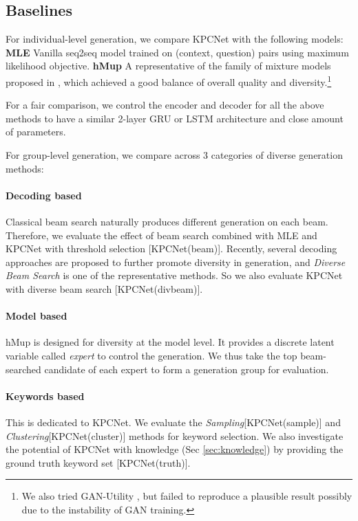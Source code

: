 \subsection{Baselines}

For individual-level generation, we compare KPCNet with the following models: \textbf{MLE} Vanilla seq2seq model trained on (context, question) pairs using maximum likelihood objective.  \textbf{hMup} A representative of the family of mixture models proposed in \citet{shen2019mixture}, which achieved a good balance of overall quality and diversity.\footnote{We also tried GAN-Utility \citep{rao2019answer}, but failed to reproduce a plausible result possibly due to the instability of GAN training.}

For a fair comparison, we control the encoder and decoder for all the above methods to have a similar 2-layer GRU \citep{cho2014learning} or LSTM \citep{hochreiter1997long} architecture and close amount of parameters. 

For group-level generation, we compare across 3 categories of diverse generation methods:

\paragraph{Decoding based} Classical beam search naturally produces different generation on each beam. Therefore, we evaluate the effect of beam search combined with MLE and KPCNet with threshold selection [KPCNet(beam)]. Recently, several decoding approaches \citep{ippolito2019comparison} are proposed to further promote diversity in generation, and \textit{Diverse Beam Search}\citep{vijayakumar2018diverse} is one of the representative methods. So we also evaluate KPCNet with diverse beam search [KPCNet(divbeam)].

\paragraph{Model based} hMup is designed for diversity at the model level. It provides a discrete latent variable called \textit{expert} to control the generation. We thus take the top beam-searched candidate of each expert to form a generation group for evaluation.

\paragraph{Keywords based} This is dedicated to KPCNet. We evaluate the \textit{Sampling}[KPCNet(sample)] and \textit{Clustering}[KPCNet(cluster)] methods for keyword selection. We also investigate the potential of KPCNet with knowledge (Sec \ref{sec:knowledge}) by providing the ground truth keyword set [KPCNet(truth)].


